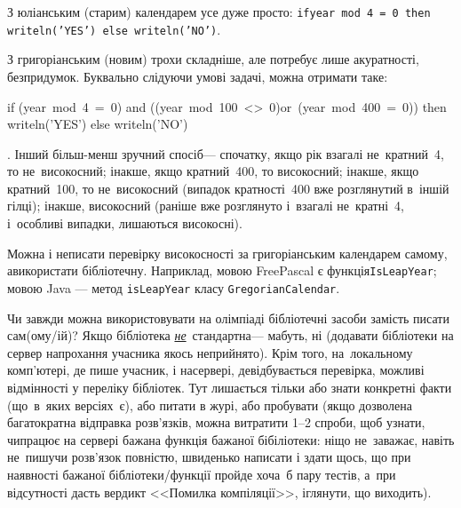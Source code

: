 \Tutorial	
З юліанським (старим) календарем усе дуже просто: \texttt{if\nolinebreak[3] \verb"year mod 4 = 0" then writeln('YES') else writeln('NO')}.
\ifAfour\else\par\fi
З григоріанським (новим) трохи складніше, але потребує лише акуратності, без\nolinebreak[3] придумок. Буквально слідуючи умові задачі, можна отримати таке: \begin{ttfamily}{if (year~mod~4~=~0)\hspace{0pt plus 1mm} and\hspace{0pt plus 1mm} ((year~mod~100~<>~0)\nolinebreak[2] or~(year~mod~400~=~0)) then writeln('YES') else writeln('NO')}\end{ttfamily}. Інший більш-менш зручний спосіб\nolinebreak[3] --- спочатку, якщо рік взагалі не~кратний~4, то не~високосний; інакше, якщо кратний~400, то високосний; інакше, якщо кратний~100, то не~високосний (випадок кратності~400 вже розглянутий в~іншій гілці); інакше, високосний (раніше вже розглянуто і~взагалі не~кратні~4, і~особливі випадки, лишаються високосні).

Можна і не\nolinebreak[3] писати 
перевірку високосності за григоріанським 
календарем самому, а\nolinebreak[3] використати бібліотечну. Наприклад, мовою \mbox{Free}\discretionary{}{}{}\mbox{Pascal} є функція\nolinebreak[3] \verb"IsLeapYear"; мовою Java --- метод \verb"isLeapYear" класу \verb"GregorianCalendar".

Чи завжди можна використовувати на олімпіаді бібліотечні засоби замість писати сам(ому/ій)? Якщо бібліотека \underline{\emph{не}}~стандартна\nolinebreak[3] --- мабуть, ні (додавати бібліотеки на сервер на\nolinebreak[3] прохання учасника якось не\nolinebreak[3] прийнято). Крім того, на~локальному комп'ютері, де пише учасник, і на\nolinebreak[3] сервері, де\nolinebreak[3] відбувається перевірка, можливі відмінності у переліку бібліотек. Тут лишається тільки або знати конкретні факти (що~в~яких версіях~є), або питати в журі, або пробувати (якщо дозволена багатократна відправка розв'язків, можна витратити 1--2 спроби, щоб узнати, чи\nolinebreak[3] працює на сервері бажана функція бажаної бібіліотеки: ніщо не~заважає, навіть не~пишучи розв'язок повністю, швиденько написати і здати щось, що при наявності бажаної бібліотеки/функції пройде хоча~б пару тестів, а~при відсутності дасть вердикт <<Помилка компіляції>>, і\nolinebreak[3] глянути, що виходить).
